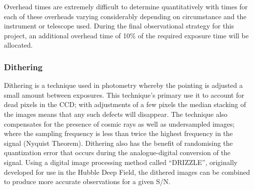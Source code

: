 		Overhead times are extremely difficult to determine quantitatively with times for each of these overheads varying considerably depending on circumstance and the instrument or telescope used. During the final observational strategy for this project, an additional overhead time of 10\% of the required exposure time will be allocated.
	\subsubsection{Dithering} %
	\label{ssub:dithering}
		Dithering is a technique used in photometry whereby the pointing is adjusted a small amount between exposures. This technique's primary use it to account for dead pixels in the CCD; with adjustments of a few pixels the median stacking of the images means that any such defects will disappear. The technique also compensates for the presence of cosmic rays as well as undersampled images; where the sampling frequency is less than twice the highest frequency in the signal (Nyquist Theorem). Dithering also has the benefit of randomising the quantization error that occurs during the analogue-digital conversion of the signal\cite{ADC_Kamensky}. Using a digital image processing method called ``DRIZZLE'', originally developed for use in the Hubble Deep Field, the dithered images can be combined to produce more accurate observations for a given S/N\cite{DRIZZLE}.

